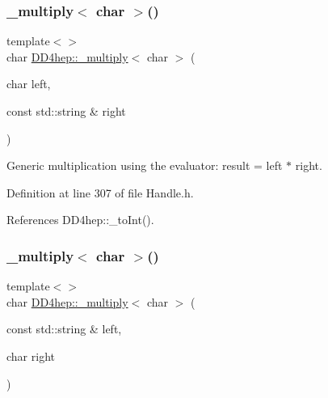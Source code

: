 \subsubsection{\texorpdfstring{\+\_\+multiply$<$ char $>$()}{\_multiply< char >()}\hspace{0.1cm}{\footnotesize\ttfamily [2/3]}}
{\footnotesize\ttfamily template$<$$>$ \\
char \hyperlink{group___d_d4_h_e_p___g_e_o_m_e_t_r_y_gab860c2299e2eb50e537c5079fb0c9c51}{D\+D4hep\+::\+\_\+multiply}$<$ char $>$ (\begin{DoxyParamCaption}\item[{char}]{left,  }\item[{const std\+::string \&}]{right }\end{DoxyParamCaption})\hspace{0.3cm}{\ttfamily [inline]}}



Generic multiplication using the evaluator\+: result = left $\ast$ right. 



Definition at line 307 of file Handle.\+h.



References D\+D4hep\+::\+\_\+to\+Int().

\hypertarget{group___d_d4_h_e_p___g_e_o_m_e_t_r_y_gaa85ae2bec079bd13cad85dd933cae0bc}{}\label{group___d_d4_h_e_p___g_e_o_m_e_t_r_y_gaa85ae2bec079bd13cad85dd933cae0bc} 
\subsubsection{\texorpdfstring{\+\_\+multiply$<$ char $>$()}{\_multiply< char >()}\hspace{0.1cm}{\footnotesize\ttfamily [3/3]}}
{\footnotesize\ttfamily template$<$$>$ \\
char \hyperlink{group___d_d4_h_e_p___g_e_o_m_e_t_r_y_gab860c2299e2eb50e537c5079fb0c9c51}{D\+D4hep\+::\+\_\+multiply}$<$ char $>$ (\begin{DoxyParamCaption}\item[{const std\+::string \&}]{left,  }\item[{char}]{right }\end{DoxyParamCaption})\hspace{0.3cm}{\ttfamily [inline]}}



